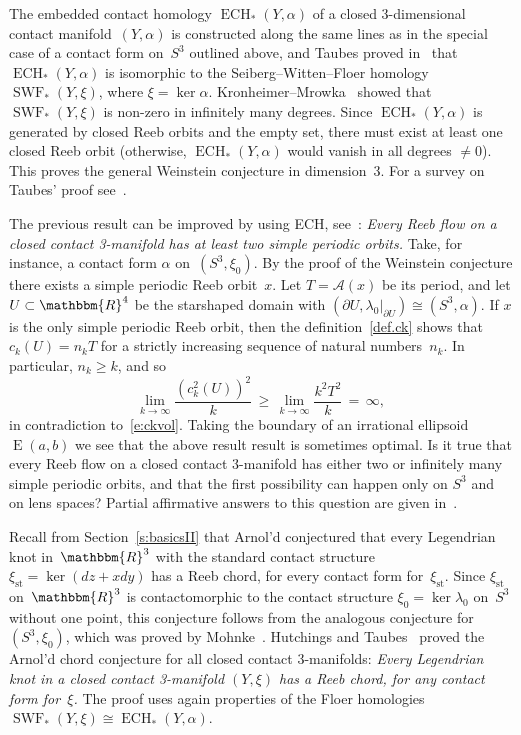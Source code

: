 \documentclass[12pt,twoside]{amsart}
\def\ECH{\operatorname{ECH}}
\def\SWF{\operatorname{SWF}}
\theoremstyle{plain}
\newtheorem{theorem}{Theorem}[section]
\numberwithin{figure}{section}
\numberwithin{equation}{section}
\def\m{\medskip}
\def\st{\operatorname{st}}
\def\ECH{\operatorname{ECH}}
\def\E{\operatorname{E}}
\def\ca{{\mathcal A}}
\def\RR{\mathbbm{R}}
\def\pp{\partial}
\def\ni{\noindent}
\def\m{\medskip}
\begin{document}
The embedded contact homology $\ECH_* (Y,\alpha)$ of a closed 3-dimensional contact manifold~$(Y,\alpha)$ is constructed along the same lines as
in the special case of a contact form on~$S^3$ outlined above,
and Taubes proved in~\cite{Ta07} that $\ECH_* (Y,\alpha)$ is isomorphic to 
the Seiberg--Witten--Floer homology $\SWF_* (Y,\xi)$, where $\xi = \ker \alpha$.
Kronheimer--Mrowka~\cite{KrMr07} showed that $\SWF_* (Y,\xi)$ is non-zero in 
infinitely many degrees.
Since $\ECH_* (Y,\alpha)$ is generated by closed Reeb orbits and the empty set, 
there must exist at least one closed Reeb orbit 
(otherwise, $\ECH_* (Y,\alpha)$ would vanish in all degrees $\neq 0$). 
This proves the general Weinstein conjecture in dimension~3.
For a survey on Taubes' proof see~\cite{Hu10}.

The previous result can be improved by using ECH, see~\cite{CGHu16}:
{\it Every Reeb flow on a closed contact 3-manifold has at least two simple periodic orbits.}
%
Take, for instance, a contact form $\alpha$ on~$(S^3,\xi_0)$.
By the proof of the Weinstein conjecture there exists a simple 
periodic Reeb orbit~$x$. 
Let $T = \ca (x)$ be its period, and 
let $U \subset \RR^4$ be the starshaped domain with $(\pp U, \lambda_0|_{\pp U}) \cong (S^3, \alpha)$.
If $x$ is the only simple periodic Reeb orbit, 
then the definition~\eqref{def.ck} shows that
$c_k(U) = n_k T$ for a strictly increasing sequence of natural numbers~$n_k$.
In particular, $n_k \geqslant k$, and so
$$
\lim_{k \to \infty} \frac{(c_k^2(U))^2}{k} \,\geqslant\, 
\lim_{k \to \infty} \frac{k^2 T^2}{k} \,=\, \infty,
$$
in contradiction to~\eqref{e:ckvol}.
%
Taking the boundary of an irrational ellipsoid $\E (a,b)$ we see that the above result result is sometimes optimal.
%
Is it true that every Reeb flow on a closed contact 3-manifold has
either two or infinitely many simple periodic orbits, 
and that the first possibility
can happen only on $S^3$ and on lens spaces?
%
Partial affirmative answers to this question are given in~\cite{CGHuPo17, HoWyZe03, HuTa09}.

Recall from Section~\ref{s:basicsII} that Arnol'd conjectured 
that every Legendrian knot in~$\RR^3$ with the standard 
contact structure $\xi_{\st} = \ker (dz+xdy)$ has a Reeb chord, 
for every contact form for~$\xi_{\st}$.
%
Since $\xi_{\st}$ on~$\RR^3$ is contactomorphic to the contact structure 
$\xi_0 = \ker \lambda_0$ on~$S^3$ without one point, 
this conjecture follows from the analogous conjecture for~$(S^3,\xi_0)$,
which was proved by Mohnke~\cite{Moh01}.
%
Hutchings and Taubes~\cite{HuTa11,HuTa13} proved the Arnol'd chord conjecture 
for all closed contact 3-manifolds:
{\it Every Legendrian knot in a closed contact 3-manifold $(Y,\xi)$ has a Reeb chord, 
for any contact form for~$\xi$.}
%
The proof uses again properties of the Floer homologies 
$\SWF_* (Y,\xi) \cong \ECH_* (Y,\alpha)$.
\end{document}

